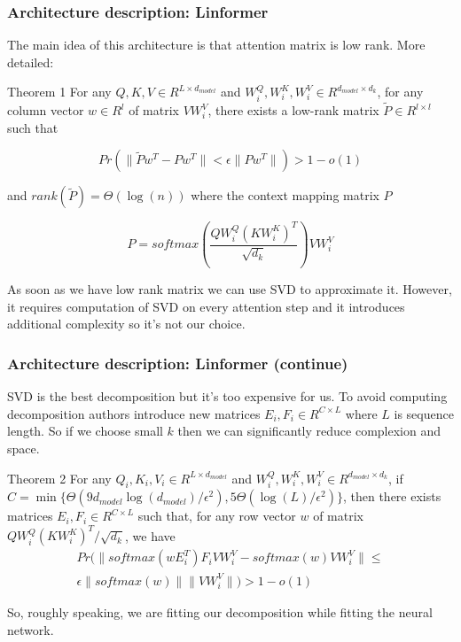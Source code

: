 \documentclass[9pt]{beamer}%
\begin{document}
\begin{frame}
	\frametitle{Architecture description: Linformer}
	The main idea of this architecture is that attention matrix is low rank. More detailed:
	
	\begin{block}{Theorem 1}
		For any $Q, K, V \in R^{L \times d_{model}}$ and $W_i^Q, W_i^K, W_i^V \in R^{d_{model} \times d_k}$, for any column vector $w \in R^l$ of matrix $V W_i^V$, there exists a low-rank matrix $\tilde{P} \in R^{l \times l}$ such that
		
		\[ Pr(\| \tilde{P}w^T - Pw^T \| < \epsilon \|Pw^T\|) > 1 - o(1) \]
		
		and $rank(\tilde{P}) = \Theta(\log(n))$	where the context mapping matrix $P$
		
		\[ P = softmax \left( \frac{QW_i^Q (KW_i^K)^T}{\sqrt{d_k}} \right) V W_i^V \]
	\end{block}

	As soon as we have low rank matrix we can use SVD to approximate it. However, it requires computation of SVD on every attention step and it introduces additional complexity so it's not our choice.
	 
\end{frame}

\begin{frame}
	\frametitle{Architecture description: Linformer (continue)}
	
	SVD is the best decomposition but it's too expensive for us. To avoid computing decomposition authors introduce new matrices $E_i, F_i \in R^{C \times L}$ where $L$ is sequence length. So if we choose small $k$ then we can significantly reduce complexion and space.
	
	\begin{block}{Theorem 2}
		For any $Q_i, K_i, V_i \in R^{L \times d_{model}}$ and $W_i^Q, W_i^K, W_i^V \in R^{d_{model} \times d_{k}}$, if $C = \min \{ \Theta (9d_{model} \log(d_{model})/\epsilon^2), 5 \Theta (\log(L)/\epsilon^2) \}$, then there exists matrices $E_i, F_i \in R^{C \times L}$ such that, for any row vector $w$ of matrix $QW_i^Q(KW_i^K)^T / \sqrt{d_{k}}$, we have
		\noindent
		\begin{multline*}
			Pr( \| softmax(wE_i^T)F_i V W_i^V - softmax(w)V W_i^V \| \le \\ \epsilon \|softmax(w)\| \|V W_i^V\| ) > 1 - o(1)
		\end{multline*}
	\end{block}

	So, roughly speaking, we are fitting our decomposition while fitting the neural network.
\end{frame}
\end{document}
